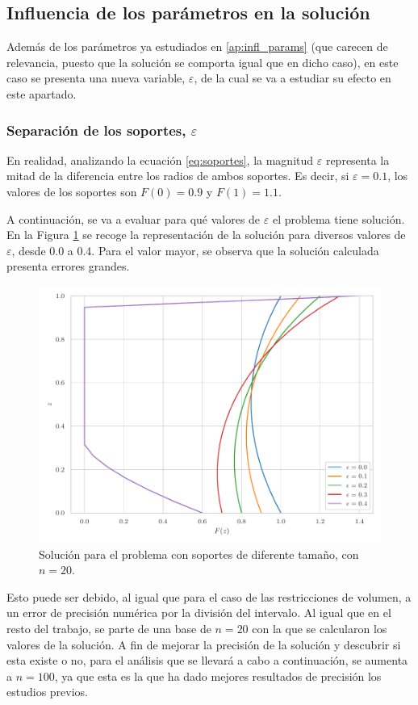 \subsection{Influencia de los parámetros en la solución}

Además de los parámetros ya estudiados en \ref{ap:infl_params} (que carecen de relevancia, puesto que la solución se comporta igual que en dicho caso), en este caso se presenta una nueva variable, $\varepsilon$, de la cual se va a estudiar su efecto en este apartado.

\subsubsection{Separación de los soportes, $\varepsilon$}

En realidad, analizando la ecuación \ref{eq:soportes}, la magnitud $\varepsilon$ representa la mitad de la diferencia entre los radios de ambos soportes. Es decir, si $\varepsilon = 0.1$, los valores de los soportes son $F(0) = 0.9$ y $F(1) = 1.1$.

A continuación, se va a evaluar para qué valores de $\varepsilon$ el problema tiene solución. En la Figura \ref{fig:sol_var_epsn20} se recoge la representación de la solución para diversos valores de $\varepsilon$, desde 0.0 a 0.4. Para el valor mayor, se observa que la solución calculada presenta errores grandes. 

\begin{figure}[h]
    \centering
    \includegraphics[width = 0.6 \linewidth]{Figures/01/sol_var_epsn20.pdf}
    \caption{Solución para el problema con soportes de diferente tamaño, con $n = 20$.}
    \label{fig:sol_var_epsn20}
\end{figure}

Esto puede ser debido, al igual que para el caso de las restricciones de volumen, a un error de precisión numérica por la división del intervalo. Al igual que en el resto del trabajo, se parte de una base de $n = 20$ con la que se calcularon los valores de la solución. A fin de mejorar la precisión de la solución y descubrir si esta existe o no, para el análisis que se llevará a cabo a continuación, se aumenta a $n = 100$, ya que esta es la que ha dado mejores resultados de precisión los estudios previos.

